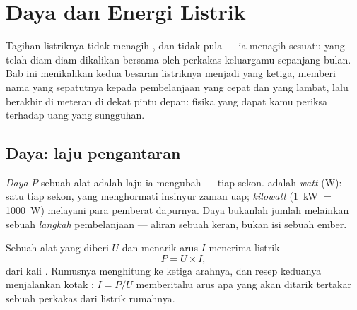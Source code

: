 \chapter{Daya dan Energi Listrik}\label{ch:g9:electric-power-energy}

Tagihan listriknya tidak menagih , dan tidak pula  --- ia
menagih sesuatu yang telah diam-diam dikalikan bersama oleh perkakas
keluargamu sepanjang bulan. Bab ini menikahkan kedua besaran
listriknya menjadi yang ketiga, memberi nama yang sepatutnya kepada
pembelanjaan yang cepat dan yang lambat, lalu berakhir di meteran di
dekat pintu depan: fisika yang dapat kamu periksa terhadap uang yang
sungguhan.

\section{Daya: laju pengantaran}

\begin{definition}\label{def:g9:electric-power-energy:power}
\emph{Daya} $P$ sebuah alat adalah laju ia mengubah 
---  tiap sekon.  adalah \emph{watt}
(\unit{W}): satu  tiap sekon, yang menghormati insinyur zaman uap;
\emph{kilowatt} (\qty{1}{kW} $=$ \qty{1000}{W}) melayani para pemberat
dapurnya. Daya bukanlah jumlah  melainkan sebuah \emph{langkah}
pembelanjaan --- aliran sebuah keran, bukan isi sebuah ember.
\end{definition}

\begin{proposition}\label{prop:g9:electric-power-energy:UI}
Sebuah alat yang diberi  $U$ dan menarik arus $I$ menerima 
listrik
\[
P = U \times I ,
\]
 dari  kali . Rumusnya menghitung ke ketiga arahnya, dan
resep keduanya menjalankan kotak : $I = P/U$ memberitahu arus
apa yang akan ditarik  tertakar sebuah perkakas dari listrik
rumahnya.
\end{proposition}

